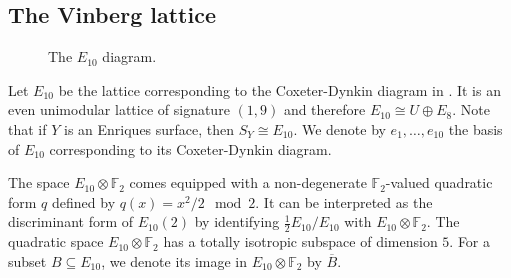 \documentclass[a4paper]{amsart}
\theoremstyle{definition}
\theoremstyle{plain}
\newcommand{\FF}{\mathbb{F}}
\begin{document}
\subsection{The Vinberg lattice}\label{sec:vinberg}
\begin{figure}
\caption{The $E_{10}$ diagram.}\label{figure:E10}
\end{figure}
Let $E_{10}$ be the lattice corresponding to the Coxeter-Dynkin diagram in .
It is an even unimodular lattice of signature $(1,9)$ and therefore $E_{10}\cong U \oplus E_8$.
Note that if $Y$ is an Enriques surface, then $S_Y\cong E_{10}$.
We denote by $e_{1}, \dots, e_{10}$ the basis of $E_{10}$ corresponding to its Coxeter-Dynkin diagram.

The space $E_{10} \otimes \FF_2$ comes equipped with a non-degenerate $\FF_2$-valued quadratic form $q$ defined by $q(x)= x^2/2 \mod 2$.
It can be interpreted as the discriminant form of $E_{10}(2)$ by identifying $\tfrac{1}{2}E_{10}/E_{10}$ with $E_{10}\otimes \FF_2$. The quadratic space $E_{10} \otimes \FF_2$ has a totally isotropic subspace of dimension $5$. For a subset $B \subseteq E_{10}$, we denote its image in $E_{10}\otimes \FF_2$ by $\overline{B}$.
\end{document}

